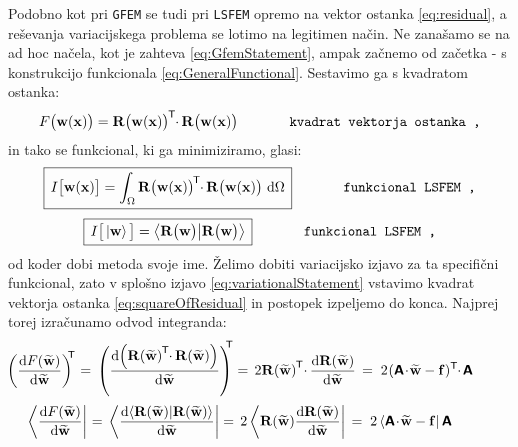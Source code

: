 Podobno kot pri \texttt{GFEM} se tudi pri \texttt{LSFEM} opremo na vektor ostanka \eqref{eq:residual}, a reševanja variacijskega problema se lotimo na legitimen način. Ne zanašamo se na ad hoc načela, kot je zahteva \eqref{eq:GfemStatement}, ampak začnemo od začetka - s konstrukcijo funkcionala \eqref{eq:GeneralFunctional}. Sestavimo ga s kvadratom ostanka:
\begin{equation}
	F\big(\mathbf{w(x)}\big)
	=
	\mathbf{R\big(w(x)\big)}^\mathsf{\mkern-1mu T} \mkern-5mu \cdot \mkern-1mu \mathbf{R\big(w(x)\big)} \hspace{1.3cm} \texttt{kvadrat vektorja ostanka ,}
	\label{eq:squareOfResidual}
\end{equation}
in tako se funkcional, ki ga minimiziramo, glasi:
\begin{equation}
	\boxed{
		\, I\big[\mathbf{w(x)}\big]
		=
		\int_{\Omega} \mathbf{R\big(w(x)\big)}^\mathsf{\mkern-2mu T} \mkern-5mu \cdot \mkern-1mu \mathbf{R\big(w(x)\big)} \ \mathrm{d} \Omega \,
	}
	\hspace{1.3cm} \texttt{funkcional LSFEM ,}
\end{equation}
\begin{equation}
	\boxed{
		\, I\big[\ket{\mathbf{w}}\big]
		=
		\bra{\mathbf{R\big(w\big)}}\ket{\mathbf{R\big(w\big)}} \,
	}
	\hspace{1.3cm} \texttt{funkcional LSFEM ,}
\end{equation}
od koder dobi metoda svoje ime. Želimo dobiti variacijsko izjavo za ta specifični funkcional, zato v splošno izjavo \eqref{eq:variationalStatement} vstavimo kvadrat vektorja ostanka \eqref{eq:squareOfResidual} in postopek izpeljemo do konca. Najprej torej izračunamo odvod integranda:
\begin{equation*}
	\hspace{-10mm}
	\left(\frac{\ud F(\widetilde{\mathbf{w}})}{\ud \widetilde{\mathbf{w}}}\right)^\mathsf{\mkern-7mu T}
	\mkern1mu = \,
	\left(\frac{\ud \! \left(\mathbf{R(\widetilde{w})}^\mathsf{\mkern-1mu T} \mkern-5mu \cdot \mkern-1mu \mathbf{R(\widetilde{w})}\right)}{\ud \mathbf{\widetilde{w}}}\right)^\mathsf{\mkern-10mu T}
	= \mkern3mu
	2 \mathbf{R(\widetilde{w})}^\mathsf{\mkern-1mu T} \mkern-4mu \cdot \mkern-1mu \frac{\ud \mathbf{R(\widetilde{w})}}{\ud \mathbf{\widetilde{w}}}
	\, = \mkern5mu
	2 \mkern1mu (\mathbsf{A} \! \cdot \! \mathbf{\widetilde{w}} - \mathbf{f})^\mathsf{T} \mkern-5mu \cdot \mkern-2mu \mathbsf{A}
\end{equation*}
\begin{equation*}
	\hspace{-10mm}
	\bra{\frac{\ud F(\widetilde{\mathbf{w}})}{\ud \widetilde{\mathbf{w}}}}
	\mkern1mu = \,
	\bra{\frac{\ud \! \bra{\mathbf{R(\widetilde{w})}}\ket{\mathbf{R(\widetilde{w})}}}{\ud \mathbf{\widetilde{w}}}}
	= \mkern3mu
	2 \bra{\mathbf{R(\widetilde{w})} \frac{\ud \mathbf{R(\widetilde{w})}}{\ud \mathbf{\widetilde{w}}}}
	\, = \mkern5mu
	2 \bra{\mathbsf{A} \! \cdot \! \mathbf{\widetilde{w}} - \mathbf{f}} \mathbsf{A}
\end{equation*}
